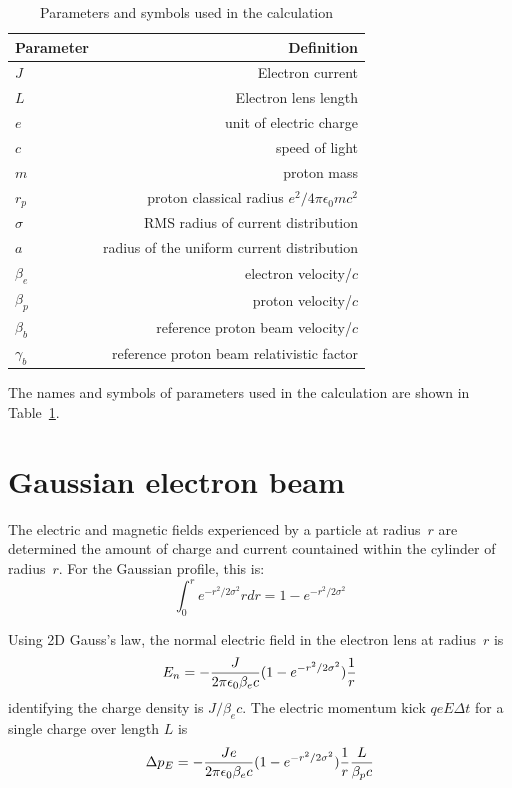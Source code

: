 \documentclass[acus]{jacow}
\begin{document}
\begin{table}[!hbt]
   \centering
   \caption{Parameters and symbols used in the calculation}
   \begin{tabular}{lr}
       \toprule
       \textbf{Parameter} & \textbf{Definition} \\
       \midrule
       $J$       & Electron current \\
       $L$       & Electron lens length  \\
       $e$       & unit of electric charge \\
       $c$       & speed of light \\
       $m$       & proton mass \\
       $r_p$     & proton classical radius $e^2/4 \pi \epsilon_0 m c^2$ \\
       $\sigma$ & RMS radius of current distribution     \\
       $a$      & radius of the uniform current distribution \\
       $\beta_e$    & electron velocity/$c$   \\
       $\beta_p$  & proton velocity/$c$ \\
       $\beta_b$  & reference proton beam velocity/$c$ \\
       $\gamma_b$ & reference proton beam relativistic factor \\
       \bottomrule
   \end{tabular}
   \label{parameters}
\end{table}
  

The names and symbols of parameters used in the calculation are shown in
Table~\ref{parameters}.

\section{Gaussian electron beam}

The electric and magnetic fields experienced by a particle at radius~$r$ are
determined the amount of charge and current countained within the cylinder
of radius~$r$.
For the Gaussian profile, this is:
$$
\int_0^{r} e^{-{{r^2} / { 2 \sigma^2}}} r dr = 1 - e^{-{{r^2} / {2 \sigma^2}}}
$$

Using 2D Gauss's law, the normal electric field in the electron lens at radius~$r$ is
$$
E_n = -{ J \over {2 \pi \epsilon_0 \beta_e c}} ( 1 - e^{-{{r^2} / {2 \sigma^2}}} ) {1 \over r}
$$
identifying the charge density is $J / \beta_e c$.
The electric momentum kick $q e E \Delta t$ for a single charge over length $L$ is
$$
\Delta p_E = -{ J e \over {2 \pi \epsilon_0 \beta_e c}} ( 1 - e^{-{{r^2} / {2 \sigma^2}}} )  {1 \over r}{ L \over { \beta_p c }}
$$
\end{document}
